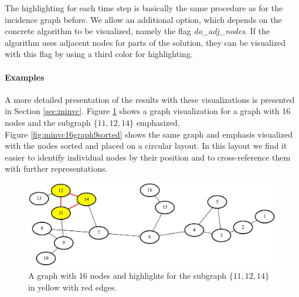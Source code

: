 \documentclass[a4paper, 12pt, bibliography=totoc]{scrartcl}
\begin{document}

The highlighting for each time step is basically the same procedure as for the incidence graph before.
We allow an additional option, which depends on the concrete algorithm to be visualized, namely the flag \textit{do\_adj\_nodes}.
If the algorithm uses adjacent nodes for parts of the solution, they can be visualized with this flag by using a third color for highlighting.\\


\paragraph{Examples}
A more detailed presentation of the results with these visualizations is presented in Section \ref{sec:minvc}.
Figure \ref{fig:minvc16graph9} shows a graph visualization for a graph with 16 nodes and the subgraph $\{11,12,14\}$ emphasized.\\
Figure \ref{fig:minvc16graph9sorted} shows the same graph and emphasis visualized with the nodes sorted and placed on a circular layout. In this layout we find it easier to identify individual nodes by their position and to cross-reference them with further representations.

\begin{figure}[H]
	\includegraphics[width=\linewidth]{images/minvc16graph9.png}
	\caption[Graph with 16 nodes]{A graph with 16 nodes and highlights for the subgraph $\{11,12,14\}$ in yellow with red edges.}
	\label{fig:minvc16graph9}
\end{figure}
\end{document}
